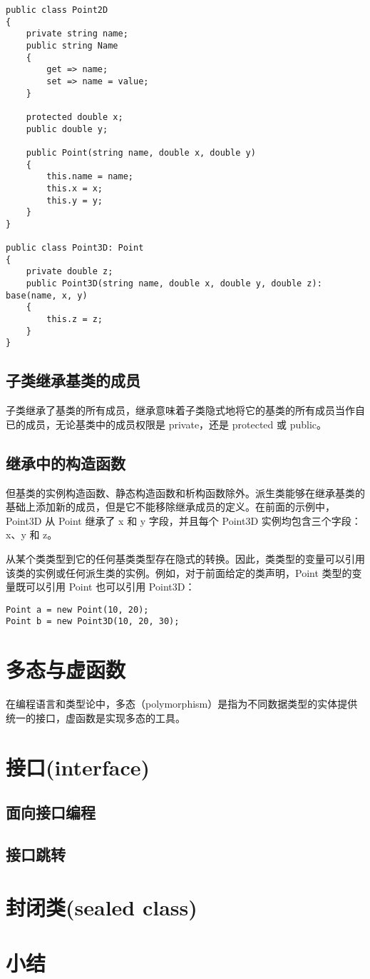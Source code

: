\begin{lstlisting}
public class Point2D
{
	private string name;
	public string Name
	{
		get => name;
		set => name = value;
	}

	protected double x;
	public double y;
	
	public Point(string name, double x, double y)
	{
		this.name = name;
		this.x = x;
		this.y = y;
	}
}

public class Point3D: Point
{
	private double z;
	public Point3D(string name, double x, double y, double z): base(name, x, y)
	{
		this.z = z;
	}
}
\end{lstlisting}


\subsection{子类继承基类的成员}

子类继承了基类的所有成员，继承意味着子类隐式地将它的基类的所有成员当作自已的成员，无论基类中的成员权限是 private，还是 protected 或 public。


\subsection{继承中的构造函数}

但基类的实例构造函数、静态构造函数和析构函数除外。派生类能够在继承基类的基础上添加新的成员，但是它不能移除继承成员的定义。在前面的示例中，Point3D 从 Point 继承了 x 和 y 字段，并且每个 Point3D 实例均包含三个字段：x、y 和 z。

从某个类类型到它的任何基类类型存在隐式的转换。因此，类类型的变量可以引用该类的实例或任何派生类的实例。例如，对于前面给定的类声明，Point 类型的变量既可以引用 Point 也可以引用 Point3D：
\begin{lstlisting}
Point a = new Point(10, 20);
Point b = new Point3D(10, 20, 30);
\end{lstlisting}

\section{多态与虚函数}
在编程语言和类型论中，多态（polymorphism）是指为不同数据类型的实体提供统一的接口，虚函数是实现多态的工具。


\section{接口(interface)}

\subsection{面向接口编程}

\subsection{接口跳转}


\section{封闭类(sealed class)}

\section{小结}